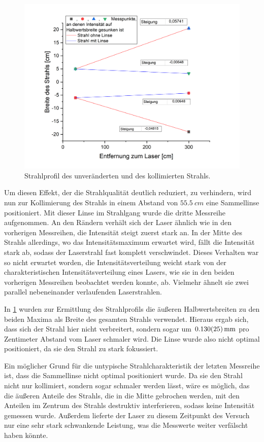 \documentclass[
	a4paper,
	12pt,
	pagesize,
	ngerman
]{scrartcl}
\begin{document}
\begin{figure}[h!]
	\centering
	\includegraphics[scale=0.5]{strahlprofil.png}
	\caption{Strahlprofil des unveränderten und des kollimierten Strahls.}
	\label{strahlprofil}
\end{figure}

Um diesen Effekt, der die Strahlqualität deutlich reduziert, zu verhindern, wird nun zur Kollimierung des Strahls in einem Abstand von $\SI{55,5}{cm}$ eine Sammellinse positioniert. Mit dieser Linse im Strahlgang wurde die dritte Messreihe aufgenommen. An den Rändern verhält sich der Laser ähnlich wie in den vorherigen Messreihen, die Intensität steigt zuerst stark an. In der Mitte des Strahls allerdings, wo das Intensitätsmaximum erwartet wird, fällt die Intensität stark ab, sodass der Laserstrahl fast komplett verschwindet. Dieses Verhalten war so nicht erwartet worden, die Intensitätsverteilung weicht stark von der charakteristischen Intensitätsverteilung eines Lasers, wie sie in den beiden vorherigen Messreihen beobachtet werden konnte, ab. Vielmehr ähnelt sie zwei parallel nebeneinander verlaufenden Laserstrahlen.

In \cref{strahlprofil} wurden zur Ermittlung des Strahlprofils die äußeren Halbwertsbreiten zu den beiden Maxima als Breite des gesamten Strahls verwendet. Hieraus ergab sich, dass sich der Strahl hier nicht verbreitert, sondern sogar um $\SI{0,130\pm0,025}{mm}$ pro Zentimeter Abstand vom Laser schmaler wird. Die Linse wurde also nicht optimal positioniert, da sie den Strahl zu stark fokussiert.

Ein möglicher Grund für die untypische Strahlcharakteristik der letzten Messreihe ist, dass die Sammellinse nicht optimal positioniert wurde. Da sie den Strahl nicht nur kollimiert, sondern sogar schmaler werden lässt, wäre es möglich, das die äußeren Anteile des Strahls, die in die Mitte gebrochen werden, mit den Anteilen im Zentrum des Strahls destruktiv interferieren, sodass keine Intensität gemessen wurde. Außerdem lieferte der Laser zu diesem Zeitpunkt des Versuch nur eine sehr stark schwankende Leistung, was die Messwerte weiter verfälscht haben könnte.
\end{document}

